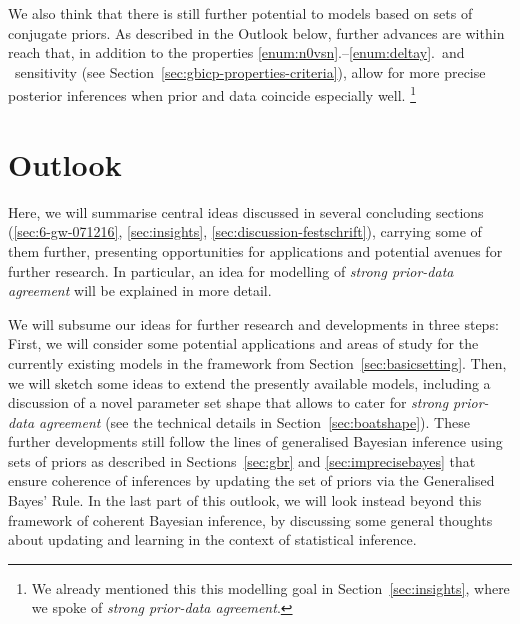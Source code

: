 We also think that there is still further potential to models based on sets of conjugate priors.
As described in the Outlook below,
further advances are within reach 
that, in addition to the properties \ref{enum:n0vsn}.--\ref{enum:deltay}.\ and \pdc\ sensitivity
(see Section~\ref{sec:gbicp-properties-criteria}),
allow for more precise posterior inferences when prior and data coincide especially well.%
\footnote{We already mentioned this this modelling goal in Section~\ref{sec:insights},
where we spoke of \emph{strong prior-data agreement}.}



\section{Outlook}
\label{sec:concluding-outlook}

Here, we will summarise central ideas discussed in several concluding sections
(\ref{sec:6-gw-071216}, \ref{sec:insights}, \ref{sec:discussion-festschrift}),
carrying some of them further, presenting %
opportunities for applications and potential avenues for further research.
In particular, an idea for modelling of \emph{strong prior-data agreement} will be explained in more detail.

We will subsume our ideas for further research and developments in three steps:
First, we will consider some potential applications and areas of study for the
currently existing models in the framework from Section~\ref{sec:basicsetting}.
Then, we will sketch some ideas to extend the presently available models,
including a discussion of a novel parameter set shape that allows to cater for
\emph{strong prior-data agreement} (see the technical details in Section~\ref{sec:boatshape}).
These further developments still follow the lines %
of generalised Bayesian inference using sets of priors as described in Sections~\ref{sec:gbr} and \ref{sec:imprecisebayes}
that ensure coherence of inferences by updating the set of priors via the Generalised Bayes' Rule.
In the last part of this outlook, we will look instead beyond this framework
of coherent Bayesian inference, by discussing some general thoughts
about updating and learning in the context of statistical inference.

\medskip

